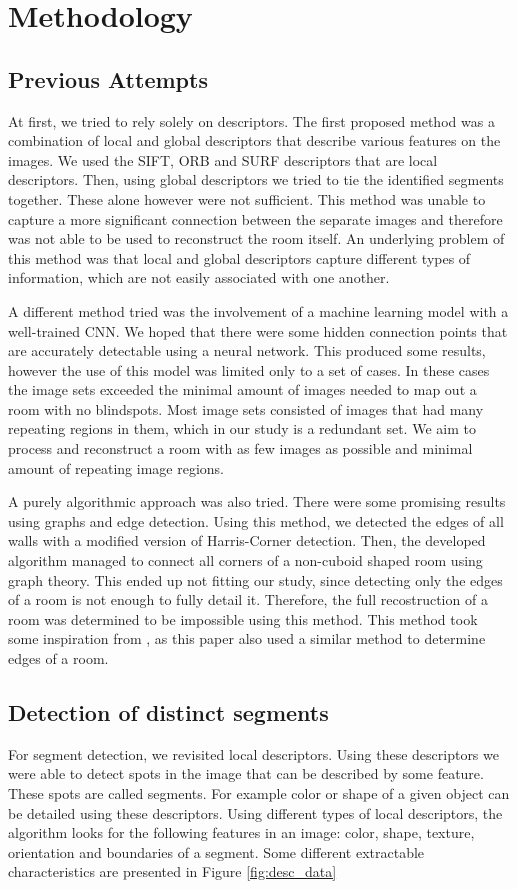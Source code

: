 \section{Methodology}
\label{sec:methodology}

\subsection{Previous Attempts} %
At first, we tried to rely solely on descriptors. The first proposed method was a combination of local and global descriptors that describe various features on the images. We used the SIFT, ORB and SURF descriptors that are local descriptors. Then, using global descriptors we tried to tie the identified segments together. These alone however were not sufficient. This method was unable to capture a more significant connection between the separate images and therefore was not able to be used to reconstruct the room itself. An underlying problem of this method was that local and global descriptors capture different types of information, which are not easily associated with one another.

A different method tried was the involvement of a machine learning model with a well-trained CNN. We hoped that there were some hidden connection points that are accurately detectable using a neural network. This produced some results, however the use of this model was limited only to a set of cases. In these cases the image sets exceeded the minimal amount of images needed to map out a room with no blindspots. Most image sets consisted of images that had many repeating regions in them, which in our study is a redundant set. We aim to process and reconstruct a room with as few images as possible and minimal amount of repeating image regions.   

A purely algorithmic approach was also tried. There were some promising results using graphs and edge detection. Using this method, we detected the edges of all walls with a modified version of Harris-Corner detection. Then, the developed algorithm managed to connect all corners of a non-cuboid shaped room using graph theory. This ended up not fitting our study, since detecting only the edges of a room is not enough to fully detail it. Therefore, the full recostruction of a room was determined to be impossible using this method. This method took some inspiration from \cite{9707088}, as this paper also used a similar method to determine edges of a room.


\subsection{Detection of distinct segments} %
For segment detection, we revisited local descriptors. Using these descriptors we were able to detect spots in the image that can be described by some feature. These spots are called segments. For example color or shape of a given object can be detailed using these descriptors. Using different types of local descriptors, the algorithm looks for the following features in an image: color, shape, texture, orientation and boundaries of a segment. Some different extractable characteristics are presented in Figure \ref{fig:desc_data}

